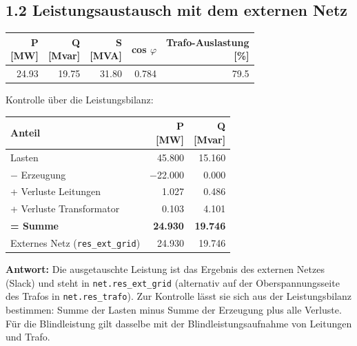 \documentclass[11pt,a4paper]{article}
\begin{document}
\subsection{1.2 Leistungsaustausch mit dem externen Netz}

\begin{table}[H]
\centering
\begin{adjustbox}{max width=\linewidth}
\begin{tabular}{rrrrr}
\toprule
\thead{P \\ {[MW]}} & \thead{Q \\ {[Mvar]}} & \thead{S \\ {[MVA]}} & \textbf{cos $\varphi$} & \thead{Trafo-Auslastung \\ {[\%]}} \\
\midrule
24.93 & 19.75 & 31.80 & 0.784 & 79.5 \\
\bottomrule
\end{tabular}
\end{adjustbox}
\end{table}

Kontrolle über die Leistungsbilanz:

\begin{table}[H]
\centering
\begin{adjustbox}{max width=\linewidth}
\begin{tabular}{lrr}
\toprule
\textbf{Anteil} & \thead{P \\ {[MW]}} & \thead{Q \\ {[Mvar]}} \\
\midrule
Lasten & 45.800 & 15.160 \\
$-$ Erzeugung & $-$22.000 & 0.000 \\
+ Verluste Leitungen & 1.027 & 0.486 \\
+ Verluste Transformator & 0.103 & 4.101 \\
\textbf{= Summe} & \textbf{24.930} & \textbf{19.746} \\
Externes Netz (\texttt{res\_\allowbreak{}ext\_\allowbreak{}grid}) & 24.930 & 19.746 \\
\bottomrule
\end{tabular}
\end{adjustbox}
\end{table}

\textbf{Antwort:} Die ausgetauschte Leistung ist das Ergebnis des externen Netzes (Slack) und steht in \texttt{net.res\_\allowbreak{}ext\_\allowbreak{}grid} (alternativ auf der Oberspannungsseite des Trafos in \texttt{net.res\_\allowbreak{}trafo}). Zur Kontrolle lässt sie sich aus der Leistungsbilanz bestimmen: Summe der Lasten minus Summe der Erzeugung plus alle Verluste. Für die Blindleistung gilt dasselbe mit der Blindleistungsaufnahme von Leitungen und Trafo.
\end{document}

